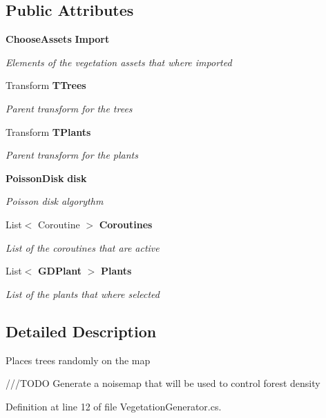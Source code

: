 \subsection*{Public Attributes}
\begin{DoxyCompactItemize}
\item 
\textbf{ Choose\+Assets} \textbf{ Import}
\begin{DoxyCompactList}\small\item\em Elements of the vegetation assets that where imported \end{DoxyCompactList}\item 
Transform \textbf{ T\+Trees}
\begin{DoxyCompactList}\small\item\em Parent transform for the trees \end{DoxyCompactList}\item 
Transform \textbf{ T\+Plants}
\begin{DoxyCompactList}\small\item\em Parent transform for the plants \end{DoxyCompactList}\item 
\textbf{ Poisson\+Disk} \textbf{ disk}
\begin{DoxyCompactList}\small\item\em Poisson disk algorythm \end{DoxyCompactList}\item 
List$<$ Coroutine $>$ \textbf{ Coroutines}
\begin{DoxyCompactList}\small\item\em List of the coroutines that are active \end{DoxyCompactList}\item 
List$<$ \textbf{ G\+D\+Plant} $>$ \textbf{ Plants}
\begin{DoxyCompactList}\small\item\em List of the plants that where selected \end{DoxyCompactList}\end{DoxyCompactItemize}


\subsection{Detailed Description}
Places trees randomly on the map 

///\+T\+O\+DO Generate a noisemap that will be used to control forest density 

Definition at line 12 of file Vegetation\+Generator.\+cs.



